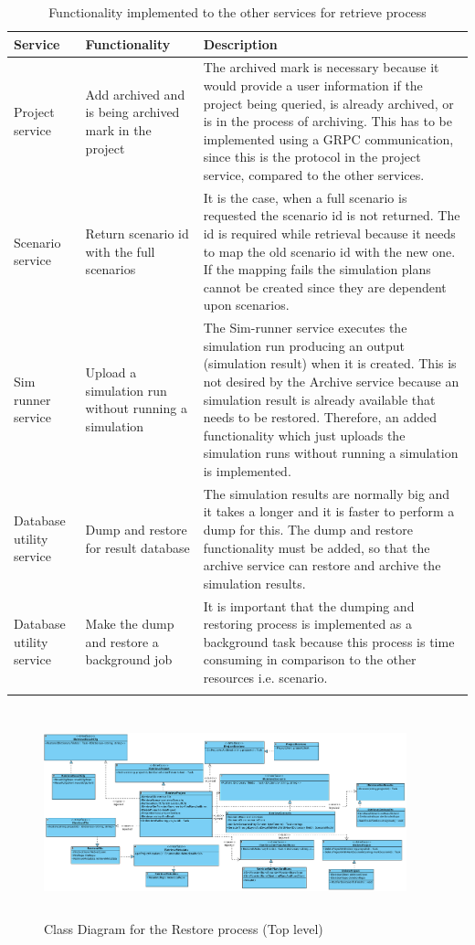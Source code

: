     \begin{longtable}{|p{2cm}|p{6cm}|p{6cm}|}
        \hline
            \textbf{Service}  & \textbf{Functionality} & \textbf{Description}\\
        \hline
            Project service & Add archived and is being archived mark in the project &  The archived mark is necessary because
            it would provide a user information if the project being queried, is already archived, or is in the process of archiving. This has to be
            implemented using a GRPC communication, since this is the protocol in the project service, compared to the other services.  \\
        \hline
            Scenario service & Return scenario id with the full scenarios & It is the case, when a full scenario is requested the scenario id is
            not returned. The id is required while retrieval because it needs to map the old scenario id with the new one. If the mapping
            fails the simulation plans cannot be created since they are dependent upon scenarios.\\
        \hline
            Sim runner service & Upload a simulation run without running a simulation & The Sim-runner service executes the simulation run producing an
            output (simulation result) when it is created. This is not desired by the Archive service because an simulation result is already available that needs to be restored.
            Therefore, an added 
            functionality which just uploads the simulation runs without running a simulation is implemented.\\
        \hline
            Database utility service & Dump and restore for result database & The simulation results are normally big and it takes a longer and it is faster to
            perform a dump for this. The dump and restore functionality must be added, so that the archive service can restore and archive the simulation results.\\
        \hline
            Database utility service & Make the dump and restore a background job & It is important that the dumping and restoring process is implemented as a background task
            because this process is time consuming in comparison to the other resources i.e. scenario.\\

        \hline
        \caption{Functionality implemented to the other services for retrieve process}
        \label{table:funcRestore} 
    \end{longtable}

\begin{figure}[H]
    \centering \includegraphics[height=6cm, angle=90, origin=c, width=10.5cm]{grafiken/restoreClass.png}
    \caption{Class Diagram for the Restore process (Top level)}
    \label{fig:restoreClass}
\end{figure}
